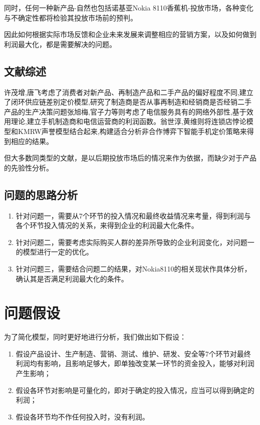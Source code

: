 \documentclass[12pt]{article}%
\begin{document}
同时，任何一种新产品-自然也包括诺基亚Nokia 8110香蕉机-投放市场，各种变化与不确定性都将检验其投放市场前的预判。

因此如何根据实际市场反馈和企业未来发展来调整相应的营销方案，以及如何做到利润最大化，都是需要解决的问题。

\subsection{文献综述}
许茂增,唐飞考虑了消费者对新产品、再制造产品和二手产品的偏好程度不同,建立了闭环供应链差别定价模型,研究了制造商是否从事再制造和经销商是否经销二手产品的生产决策问题\cite{xu}张旭梅,官子力等则考虑了电信服务具有的网络外部性,基于效用理论,建立手机制造商和电信运营商的利润函数\cite{zhao}。翁世淳,黄维则将连锁店悖论模型和KMRW声誉模型结合起来,构建适合分析非合作博弈下智能手机定价策略来得到相应的结果\cite{weng}。

但大多数同类型的文献，是以后期投放市场后的情况来作为依据，而缺少对于产品的先验性分析。
\subsection{问题的思路分析}
\begin{enumerate}[1.]\addtolength{\itemsep}{-1.5ex}
\item 针对问题一，需要从7个环节的投入情况和最终收益情况来考量，得到利润与各个环节投入情况的关系，来得到企业的利润最大化条件。
\item 针对问题二，需要考虑实际购买人群的差异所导致的企业利润变化，对问题一的模型进行一定的优化。
\item 针对问题三，需要结合问题二的结果，对Nokia8110的相关现状作具体分析，确认其是否满足利润最大化的条件。
\end{enumerate}
\section{问题假设}
为了简化模型，同时更好地进行分析，我们做出如下假设：
\begin{enumerate}[1.]\addtolength{\itemsep}{-1.5ex}
；
，即某一环节投入的资金增加，只影响最终利润，而不影响之前或之后环节的资金投入；
\item 假设产品设计、生产制造、营销、测试、维护、研发、安全等7个环节对最终利润均有影响，且影响足够大，即单独改变某一环节的资金投入，能够对利润产生影响；
\item 假设各环节对影响是可量化的，即对于确定的投入情况，应当可以得到确定的利润；
\item 假设各环节均不作任何投入时，没有利润。
\end{enumerate}
\end{document}
